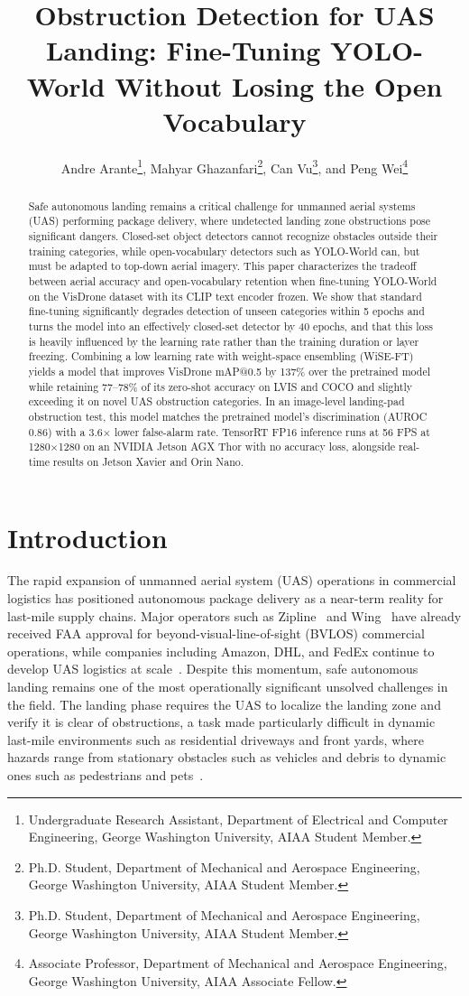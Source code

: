 \documentclass[conf]{new-aiaa}
\title{Obstruction Detection for UAS Landing: Fine-Tuning YOLO-World Without Losing the Open Vocabulary}
\author{Andre Arante\footnote{Undergraduate Research Assistant, Department of Electrical and Computer Engineering, George Washington University, AIAA Student Member.}, Mahyar Ghazanfari\footnote{Ph.D. Student, Department of Mechanical and Aerospace Engineering, George Washington University, AIAA Student Member.}, Can Vu\footnote{Ph.D. Student, Department of Mechanical and Aerospace Engineering, George Washington University, AIAA Student Member.}, and Peng Wei\footnote{Associate Professor, Department of Mechanical and Aerospace Engineering, George Washington University, AIAA Associate Fellow.
}}
\affil{George Washington University, Washington, DC, 20052}
\begin{document}
\maketitle

\begin{abstract}

Safe autonomous landing remains a critical challenge for unmanned aerial systems (UAS)
performing package delivery, where undetected landing zone obstructions pose significant
dangers. Closed-set object detectors cannot recognize obstacles outside their training
categories, while open-vocabulary detectors such as YOLO-World can, but must be adapted to
top-down aerial imagery. This paper characterizes the tradeoff between aerial accuracy and
open-vocabulary retention when fine-tuning YOLO-World on the VisDrone dataset with its CLIP
text encoder frozen. We show that standard fine-tuning significantly degrades detection of
unseen categories within 5 epochs and turns the model into an effectively closed-set
detector by 40 epochs, and that this loss is heavily influenced by the learning rate rather than the
training duration or layer freezing. Combining a low learning rate with weight-space
ensembling (WiSE-FT) yields a model that improves VisDrone mAP@0.5 by 137\% over the
pretrained model while retaining 77--78\% of its zero-shot accuracy on LVIS and COCO and
slightly exceeding it on novel UAS obstruction categories. In an image-level landing-pad
obstruction test, this model matches the pretrained model's discrimination (AUROC 0.86)
with a 3.6$\times$ lower false-alarm rate. TensorRT FP16 inference runs at 56 FPS at
1280$\times$1280 on an NVIDIA Jetson AGX Thor with no accuracy loss, alongside real-time
results on Jetson Xavier and Orin Nano.

\end{abstract}

\section{Introduction}

The rapid expansion of unmanned aerial system
(UAS) operations in commercial logistics has positioned
autonomous package delivery as a near-term reality for
last-mile supply chains. Major operators such as
Zipline~\cite{zipline2025} and Wing~\cite{wing2025} have
already received FAA approval for beyond-visual-line-of-sight
(BVLOS) commercial operations, while companies including
Amazon, DHL, and FedEx continue to develop UAS logistics
at scale~\cite{marquand2023faa, zieher2024drones}. Despite
this momentum, safe autonomous landing remains one of the
most operationally significant unsolved challenges in the
field. The landing phase requires the UAS to localize the
landing zone and verify it is clear of obstructions, a
task made particularly difficult in dynamic last-mile
environments such as residential driveways and front yards,
where hazards range from stationary obstacles such as
vehicles and debris to dynamic ones such as pedestrians
and pets~\cite{alam2023survey}.
\end{document}
